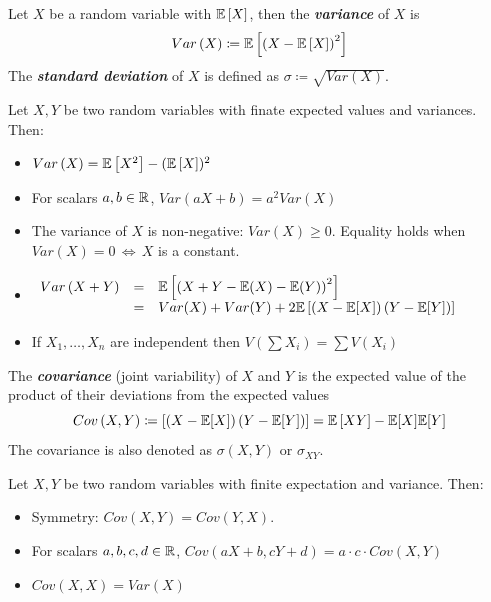 \begin{definition}
Let $X$ be a random variable with $\mathbb{E} \left[X\right]$, then the \textbf{\textit{variance}} of $X$ is
$$Var\left(X\right)\coloneqq\mathbb{E} \left[\left(X-\mathbb{E}\left[X\right]\right)^{2}\right]$$
The \textbf{\textit{standard deviation}} of $X$ is defined as $\sigma\coloneqq\sqrt{Var\left(X\right)}$.
\end{definition}
\begin{claim}
Let $X,Y$ be two random variables with finate expected values and variances. Then:
\begin{itemize}
	\item $Var\left(X\right)=\mathbb{E} \left[X^{2}\right] - (\mathbb{E} \left[X\right])^{2}$
	\item For scalars $a,b\in\mathbb{R}$, $Var\left(aX+b\right)=a^{2}Var\left(X\right)$
	\item The variance of $X$ is non-negative: $Var(X)\geq0$. Equality holds when $Var(X)=0\,\iff\,X$ is a constant.
	\item $\begin{array}{ccl}Var\left(X+Y\right)&=&\mathbb{E} \left[\left(X+Y-\mathbb{E} (X)-\mathbb{E} (Y)\right)^{2}\right]\\ &=& Var(X)+Var(Y)+2\mathbb{E} \left[\left(X-\mathbb{E} [X]\right)\left(Y-\mathbb{E} [Y]\right)\right]\end{array}$
	\item If $X_{1},\dots,X_{n}$ are independent then $V\left(\sum X_{i}\right)=\sum V\left(X_{i}\right)$
\end{itemize}
\end{claim}

\begin{definition}
The \textbf{\textit{covariance}} (joint variability) of $X$ and $Y$ is the expected value of the product of their deviations from the expected values
$$
Cov\left(X,Y\right) \coloneqq \left[\left(X-\mathbb{E} [X]\right)\left(Y-\mathbb{E} [Y]\right)\right]=\mathbb{E} \left[XY\right]-\mathbb{E} [X]\mathbb{E} [Y]
$$
The covariance is also denoted as $\sigma\left(X,Y\right)$ or $\sigma_{XY}$.
\end{definition}

\begin{claim}
Let $X,Y$ be two random variables with finite expectation and variance. Then:
\begin{itemize}
	\item Symmetry: $Cov\left(X,Y\right)=Cov\left(Y,X \right)$.
	\item For scalars $a,b,c,d\in\mathbb{R}$, $Cov\left(aX+b,cY+d \right) = a \cdot c \cdot Cov \left(X,Y \right)$
	\item $Cov\left(X,X\right)=Var\left(X\right)$
\end{itemize}
\end{claim}

